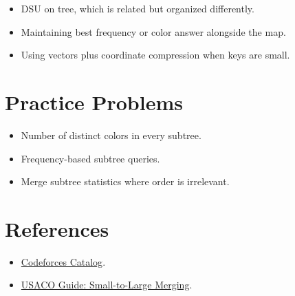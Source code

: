 \begin{itemize}
  \item DSU on tree, which is related but organized differently.
  \item Maintaining best frequency or color answer alongside the map.
  \item Using vectors plus coordinate compression when keys are small.
\end{itemize}

\section*{Practice Problems}

\begin{itemize}
  \item Number of distinct colors in every subtree.
  \item Frequency-based subtree queries.
  \item Merge subtree statistics where order is irrelevant.
\end{itemize}

\section*{References}

\begin{itemize}
  \item \href{https://codeforces.com/catalog}{Codeforces Catalog}.
  \item \href{https://usaco.guide/plat/merging}{USACO Guide: Small-to-Large Merging}.
\end{itemize}
